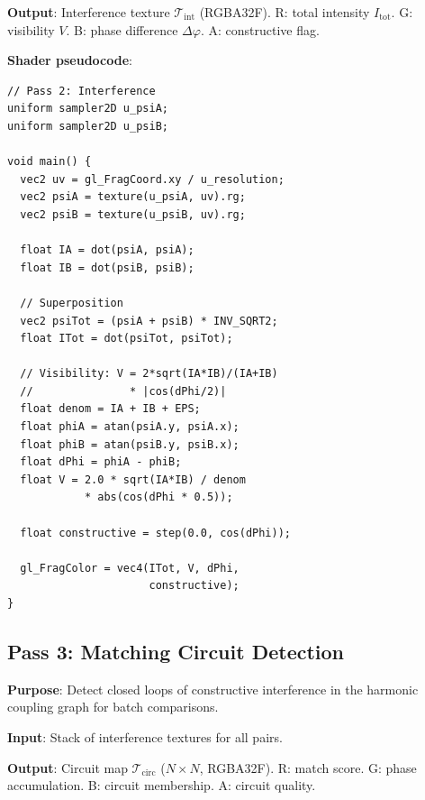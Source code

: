 \documentclass[11pt,twocolumn,a4paper]{article}
\begin{document}
\textbf{Output}: Interference texture $\mathcal{T}_{\text{int}}$
(RGBA32F). R: total intensity $I_{\text{tot}}$. G: visibility $V$.
B: phase difference $\Delta\varphi$. A: constructive flag.

\textbf{Shader pseudocode}:
\begin{lstlisting}[style=glsl]
// Pass 2: Interference
uniform sampler2D u_psiA;
uniform sampler2D u_psiB;

void main() {
  vec2 uv = gl_FragCoord.xy / u_resolution;
  vec2 psiA = texture(u_psiA, uv).rg;
  vec2 psiB = texture(u_psiB, uv).rg;

  float IA = dot(psiA, psiA);
  float IB = dot(psiB, psiB);

  // Superposition
  vec2 psiTot = (psiA + psiB) * INV_SQRT2;
  float ITot = dot(psiTot, psiTot);

  // Visibility: V = 2*sqrt(IA*IB)/(IA+IB)
  //               * |cos(dPhi/2)|
  float denom = IA + IB + EPS;
  float phiA = atan(psiA.y, psiA.x);
  float phiB = atan(psiB.y, psiB.x);
  float dPhi = phiA - phiB;
  float V = 2.0 * sqrt(IA*IB) / denom
            * abs(cos(dPhi * 0.5));

  float constructive = step(0.0, cos(dPhi));

  gl_FragColor = vec4(ITot, V, dPhi,
                      constructive);
}
\end{lstlisting}

\subsection{Pass 3: Matching Circuit Detection}
\label{subsec:pass3}

\textbf{Purpose}: Detect closed loops of constructive interference in
the harmonic coupling graph for batch comparisons.

\textbf{Input}: Stack of interference textures for all pairs.

\textbf{Output}: Circuit map $\mathcal{T}_{\text{circ}}$ ($N \times N$,
RGBA32F). R: match score. G: phase accumulation. B: circuit membership.
A: circuit quality.
\end{document}
